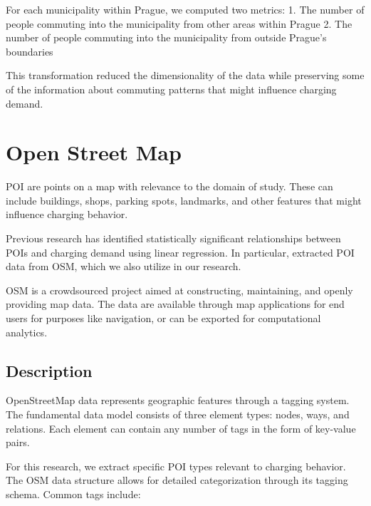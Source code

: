 For each municipality within Prague, we computed two metrics:
1. The number of people commuting into the municipality from other areas within Prague
2. The number of people commuting into the municipality from outside Prague's boundaries


This transformation reduced the dimensionality of the data while preserving some of the information about commuting patterns that might influence charging demand.

\section{Open Street Map}

\acrfull{POI} are points on a map with relevance to the domain of study. These can include buildings, shops, parking spots, landmarks, and other features that might influence charging behavior.

Previous research  has identified statistically significant relationships between POIs and charging demand using linear regression. In particular, \cite{hechtGlobalElectricVehicle2024} extracted POI data from \acrfull{OSM}, which we also utilize in our research.

\acrlong{OSM}  is a crowdsourced project aimed at constructing, maintaining, and openly providing map data. The data are available through map applications for end users for purposes like navigation, or can be exported for computational analytics.

\subsection{Description}

OpenStreetMap data represents geographic features through a tagging system. The fundamental data model consists of three element types: nodes, ways, and relations. Each element can contain any number of tags in the form of key-value pairs.

For this research, we extract specific POI types relevant to charging behavior. The OSM data structure allows for detailed categorization through its tagging schema. Common tags include:

